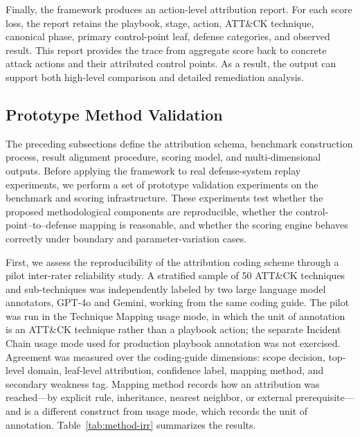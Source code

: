 Finally, the framework produces an action-level attribution report. For each score loss, the report retains the playbook, stage, action, ATT\&CK technique, canonical phase, primary control-point leaf, defense categories, and observed result. This report provides the trace from aggregate score back to concrete attack actions and their attributed control points. As a result, the output can support both high-level comparison and detailed remediation analysis.

\subsection{Prototype Method Validation}
\label{subsec:prototype-method-validation}

The preceding subsections define the attribution schema, benchmark construction process, result alignment procedure, scoring model, and multi-dimensional outputs. Before applying the framework to real defense-system replay experiments, we perform a set of prototype validation experiments on the benchmark and scoring infrastructure. These experiments test whether the proposed methodological components are reproducible, whether the control-point--to--defense mapping is reasonable, and whether the scoring engine behaves correctly under boundary and parameter-variation cases.

First, we assess the reproducibility of the attribution coding scheme through a pilot inter-rater reliability study. A stratified sample of 50 ATT\&CK techniques and sub-techniques was independently labeled by two large language model annotators, GPT-4o and Gemini, working from the same coding guide. The pilot was run in the Technique Mapping usage mode, in which the unit of annotation is an ATT\&CK technique rather than a playbook action; the separate Incident Chain usage mode used for production playbook annotation was not exercised. Agreement was measured over the coding-guide dimensions: scope decision, top-level domain, leaf-level attribution, confidence label, mapping method, and secondary weakness tag. Mapping method records how an attribution was reached---by explicit rule, inheritance, nearest neighbor, or external prerequisite---and is a different construct from usage mode, which records the unit of annotation. Table~\ref{tab:method-irr} summarizes the results.

